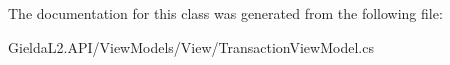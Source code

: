 The documentation for this class was generated from the following file\+:\begin{DoxyCompactItemize}
\item 
Gielda\+L2.\+A\+P\+I/\+View\+Models/\+View/Transaction\+View\+Model.\+cs\end{DoxyCompactItemize}
